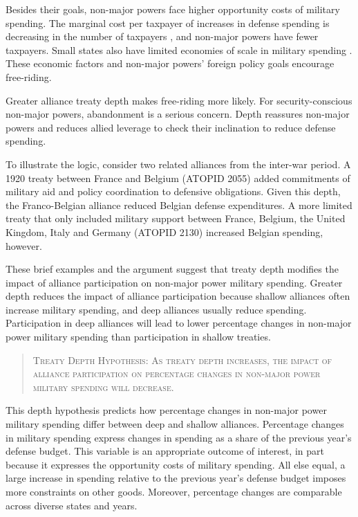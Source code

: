 \documentclass[12pt]{article}
\begin{document}
Besides their goals, non-major powers face higher opportunity costs of military spending. 
The marginal cost per taxpayer of increases in defense spending is decreasing in the number of taxpayers \citep{DudleyMontmarquette1981}, and non-major powers have fewer taxpayers. 
Small states also have limited economies of scale in military spending \citep{Moravcsik1991, Kapstein1991, Anderton1995, Devore2013}.
These economic factors and non-major powers' foreign policy goals encourage free-riding.  


Greater alliance treaty depth makes free-riding more likely. 
For security-conscious non-major powers, abandonment is a serious concern. 
Depth reassures non-major powers and reduces allied leverage to check their inclination to reduce defense spending. 


To illustrate the logic, consider two related alliances from the inter-war period. 
A 1920 treaty between France and Belgium (ATOPID 2055) added commitments of military aid and policy coordination to defensive obligations. 
Given this depth, the Franco-Belgian alliance reduced Belgian defense expenditures. 
A more limited treaty that only included military support between France, Belgium, the United Kingdom, Italy and Germany (ATOPID 2130) increased Belgian spending, however.  
 
 
These brief examples and the argument suggest that treaty depth modifies the impact of alliance participation on non-major power military spending. 
Greater depth reduces the impact of alliance participation because shallow alliances often increase military spending, and deep alliances usually reduce spending.  
Participation in deep alliances will lead to lower percentage changes in non-major power military spending than participation in shallow treaties. 
 

\begin{quote}
\textsc{Treaty Depth Hypothesis: As treaty depth increases, the impact of alliance participation on percentage changes in non-major power military spending will decrease.}
\end{quote}


This depth hypothesis predicts how percentage changes in non-major power military spending differ between deep and shallow alliances. 
Percentage changes in military spending express changes in spending as a share of the previous year's defense budget.
This variable is an appropriate outcome of interest, in part because it expresses the opportunity costs of military spending. 
All else equal, a large increase in spending relative to the previous year's defense budget imposes more constraints on other goods. 
Moreover, percentage changes are comparable across diverse states and years. 
\end{document}
